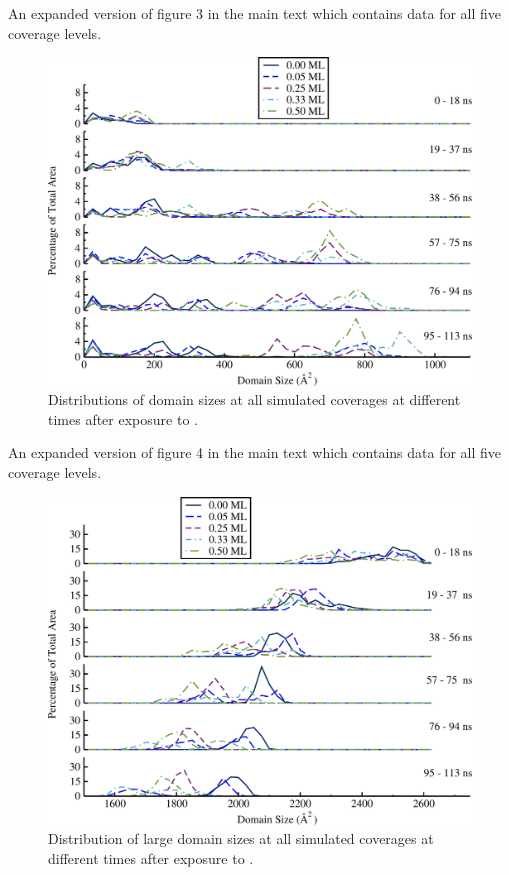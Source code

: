 \newpage

An expanded version of figure 3 in the main text which contains data
for all five  coverage levels.

\begin{figure}
\includegraphics[width=\linewidth]{../figures/appA/domainSize_Pd_SI.pdf}
\caption{Distributions of  domain sizes at all simulated
 coverages at different times after exposure to .}
\label{fig:Pd_SI}
\end{figure}

\newpage

An expanded version of figure 4 in the main text which contains data
for all five  coverage levels.

\begin{figure}
  \includegraphics[width=\linewidth]{../figures/appA/domainSizes_Pt_SI_zoomed.pdf}
  \caption{Distribution of large  domain sizes at all simulated
     coverages at different times after exposure to .}
\label{fig:Pt_SI_big}
\end{figure}

